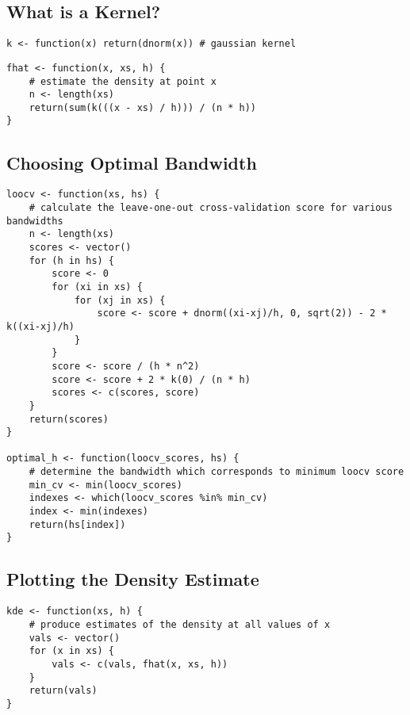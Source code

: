\documentclass[11pt]{report}
\begin{document}
\subsection*{What is a Kernel?}
\begin{verbatim}
k <- function(x) return(dnorm(x)) # gaussian kernel
\end{verbatim}


\begin{verbatim}
fhat <- function(x, xs, h) {
    # estimate the density at point x
    n <- length(xs)
    return(sum(k(((x - xs) / h))) / (n * h))
}
\end{verbatim}


\subsection*{Choosing Optimal Bandwidth}
\begin{verbatim}
loocv <- function(xs, hs) {
    # calculate the leave-one-out cross-validation score for various bandwidths
    n <- length(xs)
    scores <- vector()
    for (h in hs) {
        score <- 0
        for (xi in xs) {
            for (xj in xs) {
                score <- score + dnorm((xi-xj)/h, 0, sqrt(2)) - 2 * k((xi-xj)/h)
            }
        }
        score <- score / (h * n^2)
        score <- score + 2 * k(0) / (n * h)
        scores <- c(scores, score)
    }
    return(scores)
}

optimal_h <- function(loocv_scores, hs) {
    # determine the bandwidth which corresponds to minimum loocv score
    min_cv <- min(loocv_scores)
    indexes <- which(loocv_scores %in% min_cv)
    index <- min(indexes)
    return(hs[index])
}
\end{verbatim}


\subsection*{Plotting the Density Estimate}
\begin{verbatim}
kde <- function(xs, h) {
    # produce estimates of the density at all values of x
    vals <- vector()
    for (x in xs) {
        vals <- c(vals, fhat(x, xs, h))
    }
    return(vals)
}
\end{verbatim}
\end{document}
